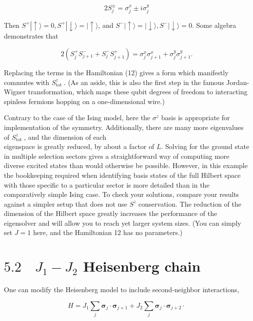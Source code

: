 \documentclass[10pt]{article}
\begin{document}
\begin{equation*}
2 S_{j}^{ \pm}=\sigma_{j}^{x} \pm i \sigma_{j}^{y} \tag{13}
\end{equation*}


Then $S^{+}|\uparrow\rangle=0, S^{+}|\downarrow\rangle=|\uparrow\rangle$, and $S^{-}|\uparrow\rangle=|\downarrow\rangle, S^{-}|\downarrow\rangle=0$. Some algebra demonstrates that


\begin{equation*}
2\left(S_{j}^{+} S_{j+1}^{-}+S_{j}^{-} S_{j+1}^{+}\right)=\sigma_{j}^{x} \sigma_{j+1}^{x}+\sigma_{j}^{y} \sigma_{j+1}^{y} . \tag{14}
\end{equation*}


Replacing the terms in the Hamiltonian (12) gives a form which manifestly commutes with $S_{\text {tot }}^{z}$. (As an aside, this is also the first step in the famous Jordan-Wigner transformation, which maps these qubit degrees of freedom to interacting spinless fermions hopping on a one-dimensional wire.)

Contrary to the case of the Ising model, here the $\sigma^{z}$ basis is appropriate for implementation of the symmetry. Additionally, there are many more eigenvalues of $S_{\text {tot }}^{z}$, and the dimension of each\\
eigenspace is greatly reduced, by about a factor of $L$. Solving for the ground state in multiple selection sectors gives a straightforward way of computing more diverse excited states than would otherwise be possible. However, in this example the bookkeeping required when identifying basis states of the full Hilbert space with those specific to a particular sector is more detailed than in the comparatively simple Ising case. To check your solutions, compare your results against a simpler setup that does not use $S^{z}$ conservation. The reduction of the dimension of the Hilbert space greatly increases the performance of the eigensolver and will allow you to reach yet larger system sizes. (You can simply set $J=1$ here, and the Hamiltonian 12 has no parameters.)

\section*{$5.2 \quad J_{1}-J_{2}$ Heisenberg chain}
One can modify the Heisenberg model to include second-neighbor interactions,


\begin{equation*}
H=J_{1} \sum_{j} \boldsymbol{\sigma}_{j} \cdot \boldsymbol{\sigma}_{j+1}+J_{2} \sum_{j} \boldsymbol{\sigma}_{j} \cdot \boldsymbol{\sigma}_{j+2} \cdot \tag{15}
\end{equation*}
\end{document}
